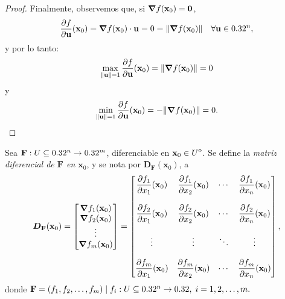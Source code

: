 \begin{theorem}
\begin{proof}
Finalmente, observemos que, si $\grad f(\mathbf{x}_0) = \mathbf{0}$, 
\[
 \frac{\partial f}{\partial {\mathbf{u}}} (\mathbf{x}_0) = \grad f (\mathbf{x}_0) \cdot {\mathbf{u}} = 0 = \norm{\grad f(\mathbf{x}_0)} \quad \forall {\mathbf{u}} \in 0.32^n,
\]
y por lo tanto:
\[
 \max_{\norm{{\mathbf{u}}}=1} \frac{\partial f}{\partial {\mathbf{u}}} (\mathbf{x}_0) = \norm{\grad f(\mathbf{x}_0)} = 0
\]
y
\[
 \min_{\norm{{\mathbf{u}}}=1} \frac{\partial f}{\partial {\mathbf{u}}} (\mathbf{x}_0) = -\norm{\grad f(\mathbf{x}_0)} = 0.
\]
\end{proof}
\end{theorem}

\begin{definition}\label{def:mat_dif}
  Sea $\mathbf{F}:U\subseteq0.32^n\to0.32^m$, diferenciable en $\mathbf{x}_0\in{\kern0ptU}^{\mathrm{o}}$. Se define la \emph{matriz diferencial de $\mathbf{F}$ en $\mathbf{x}_0$}, y se nota por $\boldsymbol{D}_{\mathbf{F}}(\mathbf{x}_0)$, a
  \[
  \boldsymbol{D}_{\mathbf{F}}(\mathbf{x}_0)=
    \begin{bmatrix} 
      \grad{f_1}(\mathbf{x}_0) \\
      \grad{f_2}(\mathbf{x}_0) \\
      \vdots     \\
      \grad{f_m}(\mathbf{x}_0)
    \end{bmatrix}
    =
    \begin{bmatrix} 
      \dfrac{\partial f_1}{\partial x_1}(\mathbf{x}_0) & \dfrac{\partial f_1}{\partial x_2}(\mathbf{x}_0) & \cdots & \dfrac{\partial f_1}{\partial x_n}(\mathbf{x}_0) \\
                     &                &        &                \\
      \dfrac{\partial f_2}{\partial x_1}(\mathbf{x}_0) & \dfrac{\partial f_2}{\partial x_2}(\mathbf{x}_0) & \cdots & \dfrac{\partial f_2}{\partial x_n}(\mathbf{x}_0) \\
                     &                &        &                \\
       \vdots         &  \vdots        & \ddots & \vdots         \\
                     &                &        &                \\
      \dfrac{\partial f_m}{\partial x_1}(\mathbf{x}_0) & \dfrac{\partial f_m}{\partial x_2}(\mathbf{x}_0) & \cdots & \dfrac{\partial f_m}{\partial x_n}(\mathbf{x}_0)
    \end{bmatrix},
  \]
  donde $\mathbf{F}=(f_1, f_2, \dots, f_m)\;|\;f_i:U\subseteq0.32^n\to0.32,\;i=1,2,\dots, m.$
\end{definition}


